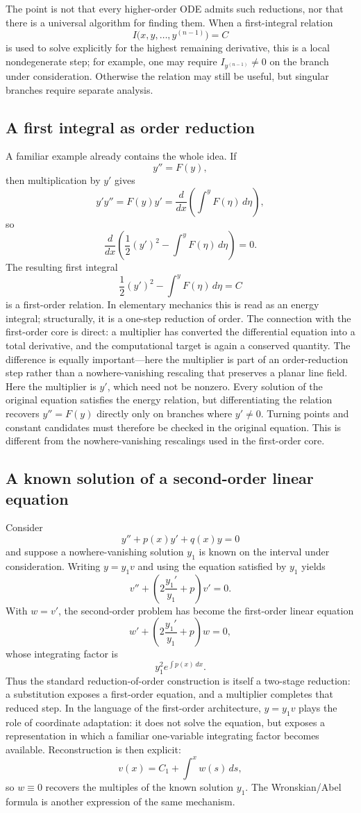 \documentclass[11pt]{article}
\theoremstyle{definition}
\begin{document}
The point is not that every higher-order ODE admits such reductions, nor that there is a universal algorithm for finding them. When a first-integral relation
\[
I\bigl(x,y,\ldots,y^{(n-1)}\bigr)=C
\]
is used to solve explicitly for the highest remaining derivative, this is a local nondegenerate step; for example, one may require \(I_{y^{(n-1)}}\neq0\) on the branch under consideration. Otherwise the relation may still be useful, but singular branches require separate analysis.

\subsection*{A first integral as order reduction}
A familiar example already contains the whole idea. If
\[
y''=F(y),
\]
then multiplication by \(y'\) gives
\[
y'y''=F(y)y'
=\frac{d}{dx}\!\left(\int^y F(\eta)\,d\eta\right),
\]
so
\[
\frac{d}{dx}\left(\frac12(y')^2-\int^y F(\eta)\,d\eta\right)=0.
\]
The resulting first integral
\[
\frac12(y')^2-\int^y F(\eta)\,d\eta=C
\]
is a first-order relation. In elementary mechanics this is read as an energy integral; structurally, it is a one-step reduction of order. The connection with the first-order core is direct: a multiplier has converted the differential equation into a total derivative, and the computational target is again a conserved quantity. The difference is equally important---here the multiplier is part of an order-reduction step rather than a nowhere-vanishing rescaling that preserves a planar line field. Here the multiplier is \(y'\), which need not be nonzero. Every solution of the original equation satisfies the energy relation, but differentiating the relation recovers \(y''=F(y)\) directly only on branches where \(y'\neq0\). Turning points and constant candidates must therefore be checked in the original equation. This is different from the nowhere-vanishing rescalings used in the first-order core.

\subsection*{A known solution of a second-order linear equation}
Consider
\[
y''+p(x)y'+q(x)y=0
\]
and suppose a nowhere-vanishing solution \(y_1\) is known on the interval under consideration. Writing \(y=y_1v\) and using the equation satisfied by \(y_1\) yields
\[
v''+\left(2\frac{y_1'}{y_1}+p\right)v'=0.
\]
With \(w=v'\), the second-order problem has become the first-order linear equation
\[
w'+\left(2\frac{y_1'}{y_1}+p\right)w=0,
\]
whose integrating factor is
\[
y_1^2 e^{\int p(x)\,dx}.
\]
Thus the standard reduction-of-order construction is itself a two-stage reduction: a substitution exposes a first-order equation, and a multiplier completes that reduced step. In the language of the first-order architecture, \(y=y_1v\) plays the role of coordinate adaptation: it does not solve the equation, but exposes a representation in which a familiar one-variable integrating factor becomes available. Reconstruction is then explicit:
\[
v(x)=C_1+\int^x w(s)\,ds,
\]
so \(w\equiv0\) recovers the multiples of the known solution \(y_1\). The Wronskian/Abel formula is another expression of the same mechanism.
\end{document}
